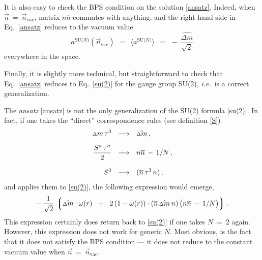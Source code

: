\documentclass[12pt]{article}
\def\beq{\begin{equation}}
\def\eeq{\end{equation}}
\newcommand{\ov}{\overline}
\newcommand{\lgr}{\left\lgroup}
\newcommand{\rgr}{\right\rgroup}
\newcommand{\aN}{a^\text{SU($N$)}}
\newcommand{\nbar}{\ov{n}}
\newcommand{\nnbar}{n\ov{n}}
\newcommand{\dm}{\hat{{\scriptstyle \Delta} m}}
\newcommand{\deltam}{{\scriptstyle \Delta} m}
\newcommand{\nvac}{\vec{n}{}_\text{vac}}
\newcommand{\ie}{{\it i.e.}~}
\newcommand{\ansatz}{{\it ansatz} }
\begin{document}
	It is also easy to check the BPS condition on the solution \eqref{ansatz}.
	Indeed, when $ \vec{n} ~=~ \nvac $, matrix $ \nnbar $ commutes with anything,
	and the right hand side in Eq.~\eqref{ansatz} reduces to the vacuum value
\beq
	\aN (\nvac)    ~~=~~    \langle \aN \rangle    ~~=~~    -\, \frac{\dm}{\sqrt{2}}
\eeq
	everywhere in the space.

	Finally, it is slightly more technical, but straightforward to check that Eq.~\eqref{ansatz}
	reduces to Eq.~\eqref{su(2)} for the gauge group SU(2), \ie is a correct generalization.

	The \ansatz \eqref{ansatz} is not the only generalization of the SU(2) formula \eqref{su(2)}.
	In fact, if one takes the ``direct'' correspondence rules (see definition \eqref{S})
\begin{align}
%
\notag
	\deltam\, \tau^3    & ~~\longrightarrow~~    \dm\,,\\[2mm]
%
	\frac{S^a\, \tau^a}{2}    & ~~\longrightarrow~~    \nnbar \,-\, 1/N \,,\\[3mm]
%
\notag
	S^3    & ~~\longrightarrow~~     (\nbar\, \tau^3\, n)\,,
\end{align}
	and applies them to \eqref{su(2)}, the following expression would emerge,
\[
	-\, \frac{1}{\sqrt{2}}\, \lgr  \dm \cdot \omega(r)  \;~+~\;  
	2\, ( 1 - \omega(r) ) \cdot (\nbar\, \dm\, n) \, \big( \nnbar \,-\, 1/N \big) \rgr.
\]
	This expression certainly does return back to \eqref{su(2)} if one takes $ N ~=~ 2 $ again.
	However, this expression does not work for generic $N$.
	Most obvious, is the fact that it does not satisfy the BPS condition ---
	it does not reduce to the constant vacuum value when $ \vec{n} ~=~ \nvac $.
\end{document}
